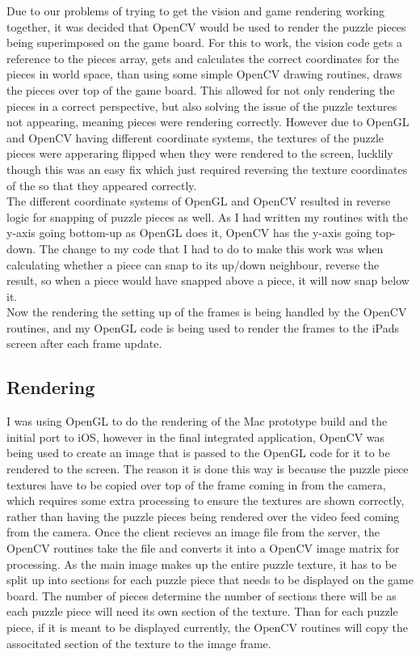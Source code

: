\documentclass{article}
\begin{document}
Due to our problems of trying to get the vision and game rendering working
together, it was decided that OpenCV would be used to render the puzzle pieces
being superimposed on the game board. For this to work, the vision code gets a
reference to the pieces array, gets and calculates the correct coordinates for
the pieces in world space, than using some simple OpenCV drawing routines, draws
the pieces over top of the game board. This allowed for not only rendering the
pieces in a correct perspective, but also solving the issue of the puzzle
textures not appearing, meaning pieces were rendering correctly. However due to
OpenGL and OpenCV having different coordinate systems, the textures of the
puzzle pieces were apperaring flipped when they were rendered to the screen,
lucklily though this was an easy fix which just required reversing the texture
coordinates of the so that they appeared correctly.\\

The different coordinate systems of OpenGL and OpenCV resulted in reverse logic
for snapping of puzzle pieces as well. As I had written my routines with the
y-axis going bottom-up as OpenGL does it, OpenCV has the y-axis going
top-down. The change to my code that I had to do to make this work was when
calculating whether a piece can snap to its up/down neighbour, reverse the
result, so when a piece would have snapped above a piece, it will now snap below
it.\\

Now the rendering the setting up of the frames is being handled by the OpenCV
routines, and my OpenGL code is being used to render the frames to the iPads
screen after each frame update. 

\subsection{Rendering}
I was using OpenGL to do the rendering of the Mac prototype build and the
initial port to iOS, however in the final integrated application, OpenCV was
being used to create an image that is passed to the OpenGL code for it to be
rendered to the screen. The reason it is done this way is because the puzzle
piece textures have to be copied over top of the frame coming in from the
camera, which requires some extra processing to ensure the textures are shown
correctly, rather than having the puzzle pieces being rendered over the video
feed coming from the camera. Once the client recieves an image file from the
server, the OpenCV routines take the file and converts it into a OpenCV image
matrix for processing. As the main image makes up the entire puzzle texture, it
has to be split up into sections for each puzzle piece that needs to be
displayed on the game board. The number of pieces determine the number of
sections there will be as each puzzle piece will need its own section of the
texture. Than for each puzzle piece, if it is meant to be displayed currently,
the OpenCV routines will copy the associtated section of the texture to the
image frame.
\end{document}
